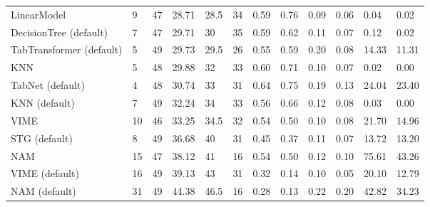 \begin{tabular}{lllllrllllll}
LinearModel & 9 & 47 & 28.71 & 28.5 & 34 & 0.59 & 0.76 & 0.09 & 0.06 & 0.04 & 0.02 \\
DecisionTree (default) & 7 & 47 & 29.71 & 30 & 35 & 0.59 & 0.62 & 0.11 & 0.07 & 0.12 & 0.02 \\
TabTransformer (default) & 5 & 49 & 29.73 & 29.5 & 26 & 0.55 & 0.59 & 0.20 & 0.08 & 14.33 & 11.31 \\
KNN & 5 & 48 & 29.88 & 32 & 33 & 0.60 & 0.71 & 0.10 & 0.07 & 0.02 & 0.00 \\
TabNet (default) & 4 & 48 & 30.74 & 33 & 31 & 0.64 & 0.75 & 0.19 & 0.13 & 24.04 & 23.40 \\
KNN (default) & 7 & 49 & 32.24 & 34 & 33 & 0.56 & 0.66 & 0.12 & 0.08 & 0.03 & 0.00 \\
VIME & 10 & 46 & 33.25 & 34.5 & 32 & 0.54 & 0.50 & 0.10 & 0.08 & 21.70 & 14.96 \\
STG (default) & 8 & 49 & 36.68 & 40 & 31 & 0.45 & 0.37 & 0.11 & 0.07 & 13.72 & 13.20 \\
NAM & 15 & 47 & 38.12 & 41 & 16 & 0.54 & 0.50 & 0.12 & 0.10 & 75.61 & 43.26 \\
VIME (default) & 16 & 49 & 39.13 & 43 & 31 & 0.32 & 0.14 & 0.10 & 0.05 & 20.10 & 12.79 \\
NAM (default) & 31 & 49 & 44.38 & 46.5 & 16 & 0.28 & 0.13 & 0.22 & 0.20 & 42.82 & 34.23 \\
\bottomrule
\end{tabular}
